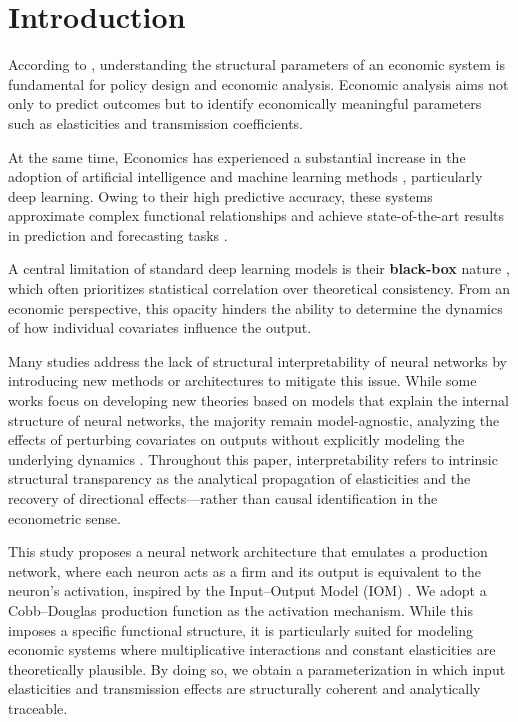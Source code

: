 \documentclass[preprint,12pt,authoryear]{sn-jnl}
\begin{document}
\section{Introduction} \label{sec:introduction}

According to \cite{imbens2024causal}, understanding the structural parameters of an economic system is fundamental for policy design and economic analysis. Economic analysis aims not only to predict outcomes but to identify economically meaningful parameters such as elasticities and transmission coefficients.

At the same time, Economics has experienced a substantial increase in the adoption of artificial intelligence and machine learning methods \citep{zheng2023deep}, particularly deep learning. Owing to their high predictive accuracy, these systems approximate complex functional relationships and achieve state-of-the-art results in prediction and forecasting tasks \citep{dell2025deep}.

A central limitation of standard deep learning models is their \textbf{black-box} nature \citep{csahin2025unlocking}, which often prioritizes statistical correlation over theoretical consistency. From an economic perspective, this opacity hinders the ability to determine the dynamics of how individual covariates influence the output.

Many studies address the lack of structural interpretability of neural networks by introducing new methods or architectures to mitigate this issue. While some works focus on developing new theories based on models that explain the internal structure of neural networks, the majority remain model-agnostic, analyzing the effects of perturbing covariates on outputs without explicitly modeling the underlying dynamics \citep{molnar2020interpretable}. Throughout this paper, interpretability refers to intrinsic structural transparency as the analytical propagation of elasticities and the recovery of directional effects—rather than causal identification in the econometric sense.

This study proposes a neural network architecture that emulates a production network, where each neuron acts as a firm and its output is equivalent to the neuron's activation, inspired by the Input–Output Model (IOM) \citep{leontief1986input}. We adopt a Cobb–Douglas production function as the activation mechanism. While this imposes a specific functional structure, it is particularly suited for modeling economic systems where multiplicative interactions and constant elasticities are theoretically plausible. By doing so, we obtain a parameterization in which input elasticities and transmission effects are structurally coherent and analytically traceable.
\end{document}
